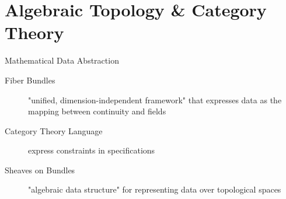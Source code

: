 \documentclass[xcolor={dvipsnames}, handout]{beamer}
\begin{document}

\section{Algebraic Topology & Category Theory}

\begin{frame}{Mathematical Data Abstraction}
    \begin{description}
        \item[Fiber Bundles] "unified, dimension-independent framework" that expresses data as the mapping between continuity and fields \cite{butlerVectorBundleClassesForm1992,butlerVisualizationModelBased1989}
        \item[Category Theory Language] express constraints in specifications \cite{wielsManagementEvolvingSpecifications1998}   
        \item[Sheaves on Bundles] "algebraic data structure" for representing data over topological spaces \cite{ghristElementaryAppliedTopology2014}
    \end{description}
\end{frame}
\end{document}
